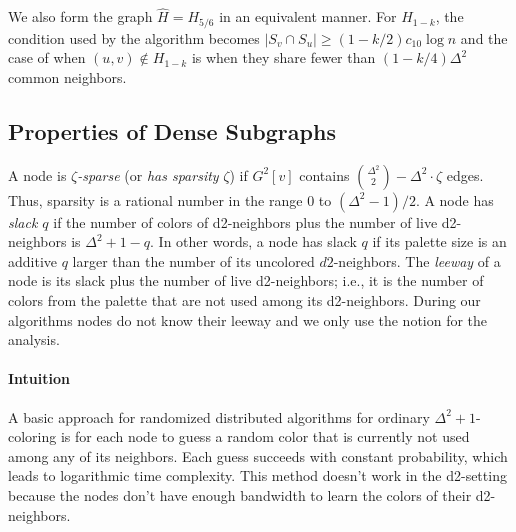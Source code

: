 We also form the graph $\hat{H} = H_{5/6}$ in an equivalent manner.
For $H_{1-k}$, the condition used by the algorithm becomes $|S_v \cap S_u| \ge (1-k/2)c_{10} \log n$ and the case of when $(u,v) \not\in H_{1-k}$ is when they share fewer than $(1-k/4)\Delta^2$ common neighbors.

\subsection{Properties of Dense Subgraphs}


%
A node is \emph{$\zeta$-sparse} (or \emph{has sparsity} $\zeta$) if $G^2[v]$ contains $\binom{\Delta^2}{2} - \Delta^2\cdot \zeta$ edges.
Thus, sparsity is a rational number in the range $0$ to $(\Delta^2-1)/2$.
A node has \emph{slack $q$} if the number of colors of d2-neighbors plus the number of live d2-neighbors is $\Delta^2+1-q$. In other words, a node has slack $q$ if its palette size is an additive $q$ larger than the number of its uncolored $d2$-neighbors. 
The \emph{leeway} of a node is its slack plus the number of live d2-neighbors; i.e., it is the number of colors from the palette that are not used among its d2-neighbors.
During our algorithms nodes do not know their leeway and we only use the notion for the analysis.

\paragraph*{Intuition}
A basic approach for randomized distributed algorithms for ordinary $\Delta^2+1$-coloring is for each node to guess a random color that is currently not used among any of its neighbors. Each guess succeeds with constant probability, which leads to logarithmic time complexity. This method doesn't work in the d2-setting because the nodes don't have enough bandwidth to learn the colors of their d2-neighbors.

